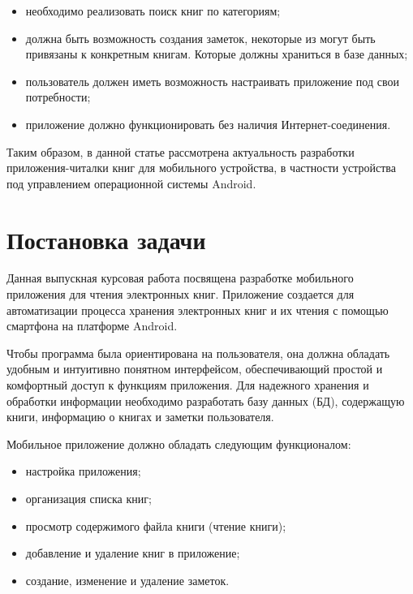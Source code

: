 \begin{itemize}
	\item необходимо реализовать поиск книг по категориям;
	\item должна быть возможность создания заметок, некоторые из
		могут быть привязаны к конкретным книгам. Которые должны
		храниться в базе данных;
	\item пользователь должен иметь возможность настраивать приложение
		под свои потребности;
	\item приложение должно функционировать без наличия Интернет-соединения.
\end{itemize}

Таким образом, в данной статье рассмотрена актуальность разработки
приложения-читалки книг для мобильного устройства, в частности устройства
под управлением операционной системы Android.

\section{Постановка задачи}
Данная выпускная курсовая работа посвящена разработке мобильного
приложения для чтения электронных книг. Приложение создается для
автоматизации процесса хранения электронных книг и их чтения с помощью
смартфона на платформе Android.\par
Чтобы программа была ориентирована на пользователя, она должна
обладать удобным и интуитивно понятном интерфейсом, обеспечивающий
простой и комфортный доступ к функциям приложения. Для надежного
хранения и обработки информации необходимо разработать базу данных (БД),
содержащую книги, информацию о книгах и заметки пользователя.\par
Мобильное приложение должно обладать следующим функционалом:

\begin{itemize}
	\item настройка приложения;
	\item организация списка книг;
	\item просмотр содержимого файла книги (чтение книги);
	\item добавление и удаление книг в приложение;
	\item создание, изменение и удаление заметок.
\end{itemize}

